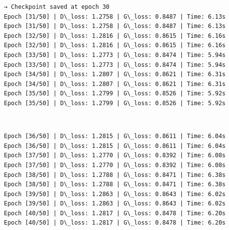 \documentclass[11pt]{article}
\begin{document}
    \begin{Verbatim}[commandchars=\\\{\}]
  → Checkpoint saved at epoch 30
Epoch [31/50] | D\_loss: 1.2758 | G\_loss: 0.8487 | Time: 6.13s
Epoch [31/50] | D\_loss: 1.2758 | G\_loss: 0.8487 | Time: 6.13s
Epoch [32/50] | D\_loss: 1.2816 | G\_loss: 0.8615 | Time: 6.16s
Epoch [32/50] | D\_loss: 1.2816 | G\_loss: 0.8615 | Time: 6.16s
Epoch [33/50] | D\_loss: 1.2773 | G\_loss: 0.8474 | Time: 5.94s
Epoch [33/50] | D\_loss: 1.2773 | G\_loss: 0.8474 | Time: 5.94s
Epoch [34/50] | D\_loss: 1.2807 | G\_loss: 0.8621 | Time: 6.31s
Epoch [34/50] | D\_loss: 1.2807 | G\_loss: 0.8621 | Time: 6.31s
Epoch [35/50] | D\_loss: 1.2799 | G\_loss: 0.8526 | Time: 5.92s
Epoch [35/50] | D\_loss: 1.2799 | G\_loss: 0.8526 | Time: 5.92s
    \end{Verbatim}

    \begin{center}
    \end{center}
    { \hspace*{\fill} \\}
    
    \begin{Verbatim}[commandchars=\\\{\}]
Epoch [36/50] | D\_loss: 1.2815 | G\_loss: 0.8611 | Time: 6.04s
Epoch [36/50] | D\_loss: 1.2815 | G\_loss: 0.8611 | Time: 6.04s
Epoch [37/50] | D\_loss: 1.2770 | G\_loss: 0.8392 | Time: 6.08s
Epoch [37/50] | D\_loss: 1.2770 | G\_loss: 0.8392 | Time: 6.08s
Epoch [38/50] | D\_loss: 1.2788 | G\_loss: 0.8471 | Time: 6.38s
Epoch [38/50] | D\_loss: 1.2788 | G\_loss: 0.8471 | Time: 6.38s
Epoch [39/50] | D\_loss: 1.2863 | G\_loss: 0.8643 | Time: 6.02s
Epoch [39/50] | D\_loss: 1.2863 | G\_loss: 0.8643 | Time: 6.02s
Epoch [40/50] | D\_loss: 1.2817 | G\_loss: 0.8478 | Time: 6.20s
Epoch [40/50] | D\_loss: 1.2817 | G\_loss: 0.8478 | Time: 6.20s
    \end{Verbatim}

    \begin{center}
    \end{center}
    { \hspace*{\fill} \\}
    
\end{document}
